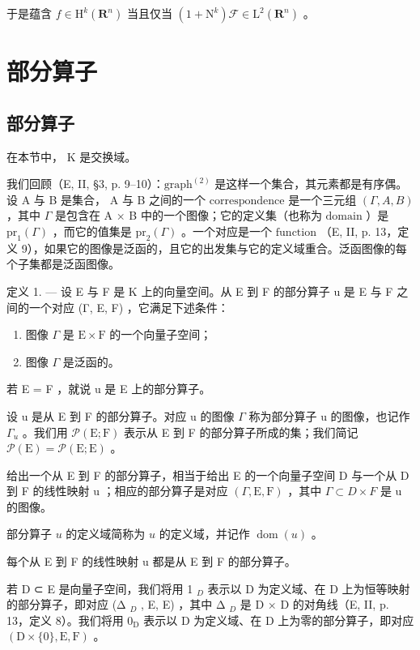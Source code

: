 于是蕴含 \(f \in \mathrm{H}^k(\mathbf{R}^n)\) 当且仅当 \((1 + \mathrm{N}^k)\mathcal{F} \in \mathrm{L}^2(\mathbf{R}^n)\) 。

\section{部分算子}

\subsection{部分算子}

在本节中， K 是交换域。

我们回顾（E, II, §3, p. 9–10）：\(\text{graph}^{(2)}\) 是这样一个集合，其元素都是有序偶。设 A 与 B 是集合， A 与 B 之间的一个 \(\text{correspondence}\) 是一个三元组 \((\Gamma, A, B)\) ，其中 \(\Gamma\) 是包含在 A × B 中的一个图像；它的定义集（也称为 \(\text{domain}\) ）是 \(\text{pr}_1(\Gamma)\) ，而它的值集是 \(\text{pr}_2(\Gamma)\) 。一个对应是一个 \(\text{function}\) （E, II, p. 13，定义 9），如果它的图像是泛函的，且它的出发集与它的定义域重合。泛函图像的每个子集都是泛函图像。

定义 1. --- 设 E 与 F 是 K 上的向量空间。从 E 到 F 的部分算子 u 是 E 与 F 之间的一个对应 (Γ, E, F) ，它满足下述条件：

\begin{enumerate}
\def\labelenumi{(\roman{enumi})}
\item
  图像 \(\Gamma\) 是 \(\mathrm{E} \times \mathrm{F}\) 的一个向量子空间；
\item
  图像 \(\Gamma\) 是泛函的。
\end{enumerate}

若 E = F ，就说 u 是 E 上的部分算子。

设 u 是从 E 到 F 的部分算子。对应 u 的图像 \(\Gamma\) 称为部分算子 u 的图像，也记作 \(\Gamma_{u}\) 。我们用 \(\mathcal{P}(\mathrm{E};\mathrm{F})\) 表示从 E 到 F 的部分算子所成的集；我们简记 \(\mathcal{P}(\mathrm{E}) = \mathcal{P}(\mathrm{E};\mathrm{E})\) 。

给出一个从 E 到 F 的部分算子，相当于给出 E 的一个向量子空间 D 与一个从 D 到 F 的线性映射 u ；相应的部分算子是对应 \((\Gamma, \mathrm{E}, \mathrm{F})\) ，其中 \(\Gamma \subset D \times F\) 是 u 的图像。

部分算子 \(u\) 的定义域简称为 \(u\) 的定义域，并记作 \(\operatorname{dom}(u)\) 。

每个从 E 到 F 的线性映射 u 都是从 E 到 F 的部分算子。

若 D ⊂ E 是向量子空间，我们将用 1 \(_{D}\) 表示以 D 为定义域、在 D 上为恒等映射的部分算子，即对应 (Δ \(_{D}\) , E, E) ，其中 Δ \(_{D}\) 是 D × D 的对角线（E, II, p. 13，定义 8）。我们将用 \(0_{\mathrm{D}}\) 表示以 D 为定义域、在 D 上为零的部分算子，即对应 \((\mathrm{D} \times \{0\}, \mathrm{E}, \mathrm{F})\) 。

